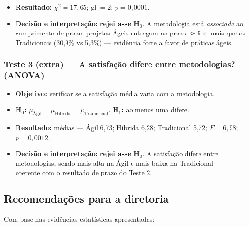 \documentclass[a4paper, 12pt]{article}
\begin{document}
\begin{itemize}[noitemsep]
	\item \textbf{Resultado:} $\chi^2 = 17{,}65$; gl $= 2$; \textbf{$p = 0{,}0001$}.
	\item \textbf{Decisão e interpretação:} \textbf{rejeita-se H$_0$}. A
	      metodologia está \emph{associada} ao cumprimento de prazo: projetos Ágeis
	      entregam no prazo $\approx 6\times$ mais que os Tradicionais
	      (30,9\% vs 5,3\%) --- evidência forte a favor de práticas ágeis.
\end{itemize}

\subsubsection*{Teste 3 (extra) --- A satisfação difere entre metodologias? (ANOVA)}
\begin{itemize}[noitemsep]
	\item \textbf{Objetivo:} verificar se a satisfação média varia com a metodologia.
	\item \textbf{H$_0$:} $\mu_{\text{Ágil}} = \mu_{\text{Híbrida}} = \mu_{\text{Tradicional}}$.
	      \quad\textbf{H$_1$:} ao menos uma difere.
	\item \textbf{Resultado:} médias --- Ágil 6,73; Híbrida 6,28; Tradicional 5,72;
	      $F = 6{,}98$; \textbf{$p = 0{,}0012$}.
	\item \textbf{Decisão e interpretação:} \textbf{rejeita-se H$_0$}. A satisfação
	      difere entre metodologias, sendo mais alta na Ágil e mais baixa na
	      Tradicional --- coerente com o resultado de prazo do Teste 2.
\end{itemize}

\subsection{Recomendações para a diretoria}
\label{sec:recomendacoes}

Com base nas evidências estatísticas apresentadas:
\end{document}
